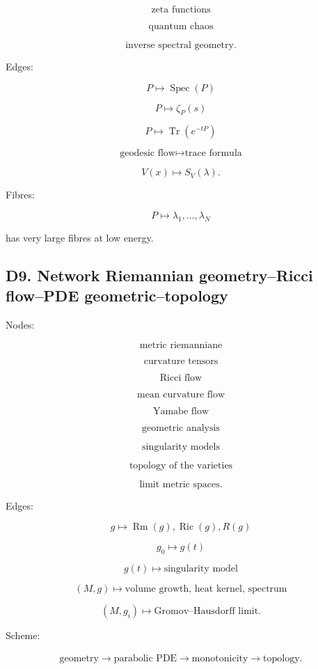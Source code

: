 \documentclass[11pt]{article}
\begin{document}
\[
\text{zeta functions}
\]

\[
\text{quantum chaos}
\]

\[
\text{inverse spectral geometry}.
\]

Edges:

\[
P\mapsto \operatorname{Spec}(P)
\]

\[
P\mapsto \zeta_P(s)
\]

\[
P\mapsto \operatorname{Tr}(e^{-tP})
\]

\[
\text{geodesic flow}\mapsto \text{trace formula}
\]

\[
V(x)\mapsto S_V(\lambda).
\]

Fibres:

\[
P\mapsto {\lambda_1,\ldots,\lambda_N}
\]

has very large fibres at low energy.



\subsection{D9. Network Riemannian geometry--Ricci flow--PDE geometric--topology}

Nodes:

\[
\text{metric riemanniane}
\]

\[
\text{curvature tensors}
\]

\[
\text{Ricci flow}
\]

\[
\text{mean curvature flow}
\]

\[
\text{Yamabe flow}
\]

\[
\text{geometric analysis}
\]

\[
\text{singularity models}
\]

\[
\text{topology of the varieties}
\]

\[
\text{limit metric spaces}.
\]

Edges:

\[
g\mapsto \operatorname{Rm}(g),\operatorname{Ric}(g),R(g)
\]

\[
g_0\mapsto g(t)
\]

\[
g(t)\mapsto \text{singularity model}
\]

\[
(M,g)\mapsto \text{volume growth, heat kernel, spectrum}
\]

\[
(M,g_i)\mapsto \text{Gromov--Hausdorff limit}.
\]

Scheme:

\[
\begin{gathered}
\text{geometry} \to \text{parabolic PDE} \to \text{monotonicity} \to \text{topology}.
\end{gathered}
\]
\end{document}
